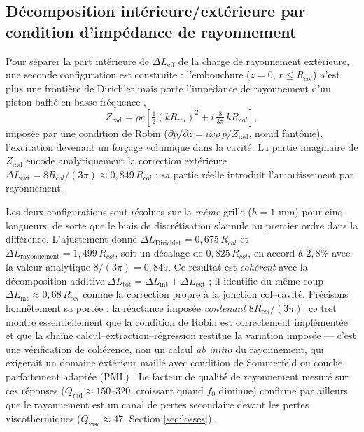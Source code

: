 \documentclass[11pt,a4paper,twocolumn]{article}
\begin{document}
\subsection{Décomposition intérieure/extérieure par condition d'impédance de rayonnement}
\label{sec:radiation}
Pour séparer la part intérieure de $\Delta L_{\mathrm{eff}}$ de la charge de rayonnement extérieure, une seconde configuration est construite : l'embouchure ($z=0$, $r\leq R_{col}$) n'est plus une frontière de Dirichlet mais porte l'impédance de rayonnement d'un piston bafflé en basse fréquence \cite{rayleigh1896, morse1968theoretical},
\begin{equation}
Z_{\mathrm{rad}} = \rho c\left[\tfrac{1}{2}(kR_{col})^2 + i\,\tfrac{8}{3\pi}\,kR_{col}\right],
\end{equation}
imposée par une condition de Robin ($\partial p/\partial z = i\omega\rho\, p/Z_{\mathrm{rad}}$, nœud fantôme), l'excitation devenant un forçage volumique dans la cavité. La partie imaginaire de $Z_{\mathrm{rad}}$ encode analytiquement la correction extérieure $\Delta L_{\mathrm{ext}} = 8R_{col}/(3\pi) \approx 0{,}849\,R_{col}$ ; sa partie réelle introduit l'amortissement par rayonnement.

Les deux configurations sont résolues sur la \emph{même} grille ($h=1$ mm) pour cinq longueurs, de sorte que le biais de discrétisation s'annule au premier ordre dans la différence. L'ajustement donne $\Delta L_{\mathrm{Dirichlet}} = 0{,}675\,R_{col}$ et $\Delta L_{\mathrm{rayonnement}} = 1{,}499\,R_{col}$, soit un décalage de $0{,}825\,R_{col}$, en accord à $2{,}8\%$ avec la valeur analytique $8/(3\pi) = 0{,}849$. Ce résultat est \emph{cohérent} avec la décomposition additive $\Delta L_{\mathrm{tot}} = \Delta L_{\mathrm{int}} + \Delta L_{\mathrm{ext}}$ ; il identifie du même coup $\Delta L_{\mathrm{int}} \approx 0{,}68\,R_{col}$ comme la correction propre à la jonction col–cavité. Précisons honnêtement sa portée : la réactance imposée \emph{contenant} $8R_{col}/(3\pi)$, ce test montre essentiellement que la condition de Robin est correctement implémentée et que la chaîne calcul–extraction–régression restitue la variation imposée — c'est une vérification de cohérence, non un calcul \emph{ab initio} du rayonnement, qui exigerait un domaine extérieur maillé avec condition de Sommerfeld ou couche parfaitement adaptée (PML) \cite{berenger1994perfectly}. Le facteur de qualité de rayonnement mesuré sur ces réponses ($Q_{\mathrm{rad}} \approx 150$–$320$, croissant quand $f_0$ diminue) confirme par ailleurs que le rayonnement est un canal de pertes secondaire devant les pertes viscothermiques ($Q_{\mathrm{visc}}\approx47$, Section \ref{sec:losses}).
\end{document}

